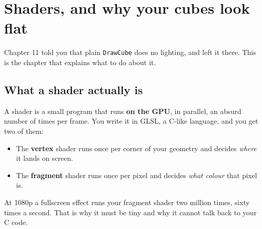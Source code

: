 \chapter{Shaders, and why your cubes look flat}

Chapter 11 told you that plain \lstinline|DrawCube| does no lighting, and left it
there. This is the chapter that explains what to do about it.

\section{What a shader actually is}

A shader is a small program that runs \textbf{on the GPU}, in parallel, an
absurd number of times per frame. You write it in GLSL, a C-like language, and
you get two of them:

\begin{center}
\end{center}

\begin{itemize}[leftmargin=*,itemsep=3pt]
  \item The \textbf{vertex} shader runs once per corner of your geometry and
        decides \emph{where} it lands on screen.
  \item The \textbf{fragment} shader runs once per pixel and decides \emph{what
        colour} that pixel is.
\end{itemize}

At 1080p a fullscreen effect runs your fragment shader two million times, sixty
times a second. That is why it must be tiny and why it cannot talk back to your
C code.

